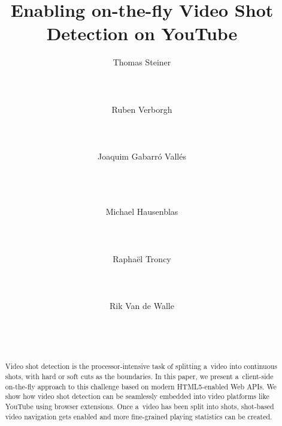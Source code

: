 \documentclass{sig-alternate}
\begin{document}
\title{Enabling on-the-fly Video Shot Detection on YouTube}

\author{
\alignauthor
Thomas Steiner\\
	\\
	\\
	\\
\alignauthor
Ruben Verborgh\\
	\\
	\\
	\\
\alignauthor
Joaquim Gabarr\'o Vall\'es\\
	\\
	\\
	\\
\and
\alignauthor	
Michael Hausenblas\\
	\\
	\\
	\\
	\setlength\parindent{-2.2em}
\alignauthor	
Rapha\"{e}l Troncy\\
       \\
       \\
       \\
\alignauthor
Rik Van de Walle\\
	\\
	\\
	\\
	\setlength\parindent{1em}
}
\maketitle
\begin{abstract}
Video shot detection is the processor-intensive task of splitting a~video into continuous shots, with hard or soft cuts as the boundaries. In this paper, we present a~client-side on-the-fly approach to this challenge based on modern HTML5-enabled Web APIs. We show how video shot detection can be seamlessly embedded into video platforms like YouTube using browser extensions. Once a~video has been split into shots, shot-based video navigation gets enabled and more fine-grained playing statistics can be created.
\end{abstract}
\end{document}
